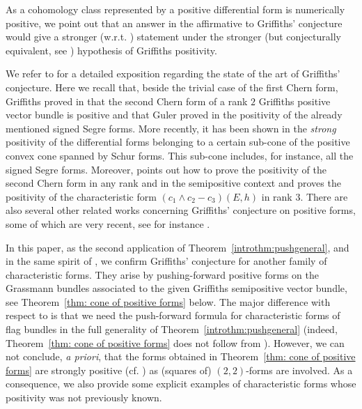 \documentclass[a4paper]{amsart}
\theoremstyle{plain}%
\theoremstyle{definition}
\theoremstyle{remark}
\begin{document}
	As a cohomology class represented by a positive differential form is numerically positive, we point out that an answer in the affirmative to Griffiths' conjecture would give a stronger (w.r.t. \cite{FL83}) statement under the stronger (but conjecturally equivalent, see \cite{Gri69}) hypothesis of Griffiths positivity.
	
	We refer to \cite{Fag20} for a detailed exposition regarding the state of the art of Griffiths' conjecture.
	Here we recall that, beside the trivial case of the first Chern form, Griffiths proved in \cite[Appendix to~\S 5.(b)]{Gri69} that the second Chern form of a rank $ 2 $ Griffiths positive vector bundle is positive and that Guler proved in \cite[Theorem~1.1]{Gul12} the positivity of the already mentioned signed Segre forms.
	More recently, it has been shown in \cite[Main Application]{DF20} the \emph{strong} positivity of the differential forms belonging to a certain sub-cone of the positive convex cone spanned by Schur forms.
	This sub-cone includes, for instance, all the signed Segre forms.
	Moreover, \cite[Theorem~{2.2}]{Fag20} points out how to prove the positivity of the second Chern form in any rank and in the semipositive context and \cite[Theorem~{0.1}]{Fag20} proves the positivity of the characteristic form $ (c_1 \wedge c_2 - c_3)(E,h) $ in rank $ 3 $.
	There are also several other related works concerning Griffiths' conjecture on positive forms, some of which are very recent, see for instance \cite{Div16,Pin18,Li20,RT21,Xia20,Fin20}.
	
	In this paper, as the second application of Theorem~\ref{introthm:pushgeneral}, and in the same spirit of \cite{Gul12,DF20}, we confirm Griffiths' conjecture for another family of characteristic forms.
	They arise by pushing-forward positive forms on the Grassmann bundles associated to the given Griffiths semipositive vector bundle, see Theorem~\ref{thm: cone of positive forms} below.
	The major difference with respect to \cite[Main~Application]{DF20} is that we need the push-forward formula for characteristic forms of flag bundles in the full generality of Theorem~\ref{introthm:pushgeneral} (indeed, Theorem~\ref{thm: cone of positive forms} does not follow from \cite[Main~Theorem]{DF20}).
	However, we can not conclude, \textsl{a priori}, that the forms obtained in Theorem~\ref{thm: cone of positive forms} are strongly positive (cf. \cite[Remark~{4.9}]{DF20}) as (squares of) $ (2,2) $-forms are involved.
	As a consequence, we also provide some explicit examples of characteristic forms whose positivity was not previously known.
	
\end{document}
